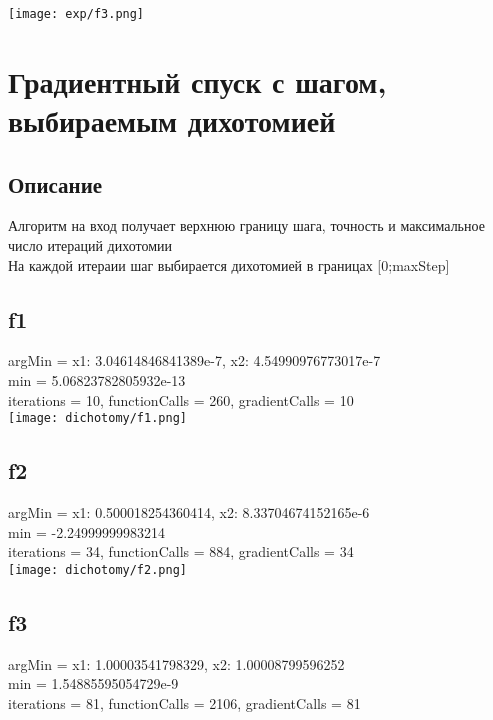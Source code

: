 \documentclass{article}
\begin{document}
\texttt{[image: exp/f3.png]} \\

\section{Градиентный спуск с шагом, выбираемым дихотомией}

\subsection{Описание}
Алгоритм на вход получает верхнюю границу шага, точность и максимальное число итераций дихотомии \\
На каждой итераии шаг выбирается дихотомией в границах [0;maxStep]

\subsection{f1}

argMin = {x1: 3.04614846841389e-7, x2: 4.54990976773017e-7} \\
min =  5.06823782805932e-13 \\
iterations =  10, functionCalls =  260, gradientCalls =  10 \\

\texttt{[image: dichotomy/f1.png]} \\

\subsection{f2}

argMin = {x1: 0.500018254360414, x2: 8.33704674152165e-6} \\
min =  -2.24999999983214 \\
iterations =  34, functionCalls =  884, gradientCalls =  34 \\

\texttt{[image: dichotomy/f2.png]} \\

\subsection{f3}

argMin = {x1: 1.00003541798329, x2: 1.00008799596252} \\
min =  1.54885595054729e-9 \\
iterations =  81, functionCalls =  2106, gradientCalls =  81 \\
\end{document}
